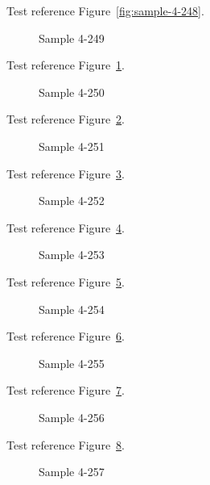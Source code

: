 Test reference Figure~\ref{fig:sample-4-248}.

\begin{figure}[tbhp]
\caption{Sample 4-249}
\label{fig:sample-4-249}
\end{figure}

Test reference Figure~\ref{fig:sample-4-249}.

\begin{figure}[tbhp]
\caption{Sample 4-250}
\label{fig:sample-4-250}
\end{figure}

Test reference Figure~\ref{fig:sample-4-250}.

\begin{figure}[tbhp]
\caption{Sample 4-251}
\label{fig:sample-4-251}
\end{figure}

Test reference Figure~\ref{fig:sample-4-251}.

\begin{figure}[tbhp]
\caption{Sample 4-252}
\label{fig:sample-4-252}
\end{figure}

Test reference Figure~\ref{fig:sample-4-252}.

\begin{figure}[tbhp]
\caption{Sample 4-253}
\label{fig:sample-4-253}
\end{figure}

Test reference Figure~\ref{fig:sample-4-253}.

\begin{figure}[tbhp]
\caption{Sample 4-254}
\label{fig:sample-4-254}
\end{figure}

Test reference Figure~\ref{fig:sample-4-254}.

\begin{figure}[tbhp]
\caption{Sample 4-255}
\label{fig:sample-4-255}
\end{figure}

Test reference Figure~\ref{fig:sample-4-255}.

\begin{figure}[tbhp]
\caption{Sample 4-256}
\label{fig:sample-4-256}
\end{figure}

Test reference Figure~\ref{fig:sample-4-256}.

\begin{figure}[tbhp]
\caption{Sample 4-257}
\label{fig:sample-4-257}
\end{figure}

